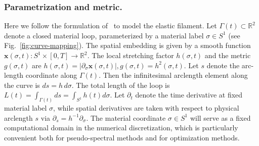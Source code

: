 \documentclass[
aip,
jcp,
reprint, 
floatfix
]{revtex4-1}
\begin{document}
\subsubsection{Parametrization and metric.}
Here we follow the formulation of~\cite{nakayama1993motion, gross2025elastic} to model the elastic filament. Let $\Gamma(t)\subset \mathbb{R}^2$ denote a closed material loop, parameterized by a material
label $\sigma\in S^1$ (see Fig.~\ref{fig:curve-mapping}). The spatial embedding is given by a smooth function
$
\mathbf{x}(\sigma,t) : S^1\times[0,T]\to\mathbb{R}^2.
$
The local stretching factor $h(\sigma,t)$ and the metric $g(\sigma,t)$ are
$
h(\sigma,t) = \left| \partial_\sigma \mathbf{x}(\sigma,t)\right|, g(\sigma,t) = h^2(\sigma,t).
$
Let $s$ denote the arc-length coordinate along $\Gamma(t)$. Then the infinitesimal arclength element along the curve is
$
ds = h\,d\sigma$. The total length of the loop is $L(t) = \int_{\Gamma(t)} ds=\int_{S^1} h(t)d\sigma$. Let $\partial_t$ denote the time derivative at fixed material label $\sigma$, while spatial derivatives are taken with respect to physical arclength $s$ via $\partial_s=h^{-1} \partial_\sigma$.
The material coordinate $\sigma\in S^1$ will serve as a fixed computational domain in the numerical
discretization, which is particularly convenient both for pseudo-spectral methods and for optimization methods.
\vspace{-15pt}
\end{document}
